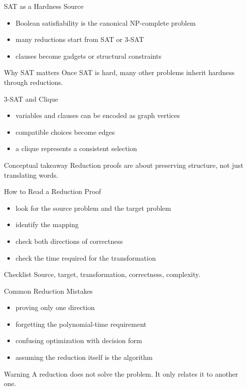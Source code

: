 \documentclass[aspectratio=169,xcolor=dvipsnames]{beamer}
\begin{document}
\begin{frame}{SAT as a Hardness Source}
  \begin{itemize}
    \item Boolean satisfiability is the canonical NP-complete problem
    \item many reductions start from SAT or 3-SAT
    \item clauses become gadgets or structural constraints
  \end{itemize}
  \begin{block}{Why SAT matters}
    Once SAT is hard, many other problems inherit hardness through reductions.
  \end{block}
\end{frame}

\begin{frame}{3-SAT and Clique}
  \begin{itemize}
    \item variables and clauses can be encoded as graph vertices
    \item compatible choices become edges
    \item a clique represents a consistent selection
  \end{itemize}
  \begin{alertblock}{Conceptual takeaway}
    Reduction proofs are about preserving structure, not just translating words.
  \end{alertblock}
\end{frame}

\begin{frame}{How to Read a Reduction Proof}
  \begin{itemize}
    \item look for the source problem and the target problem
    \item identify the mapping
    \item check both directions of correctness
    \item check the time required for the transformation
  \end{itemize}
  \begin{block}{Checklist}
    Source, target, transformation, correctness, complexity.
  \end{block}
\end{frame}

\begin{frame}{Common Reduction Mistakes}
  \begin{itemize}
    \item proving only one direction
    \item forgetting the polynomial-time requirement
    \item confusing optimization with decision form
    \item assuming the reduction itself is the algorithm
  \end{itemize}
  \begin{alertblock}{Warning}
    A reduction does not solve the problem. It only relates it to another one.
  \end{alertblock}
\end{frame}
\end{document}
